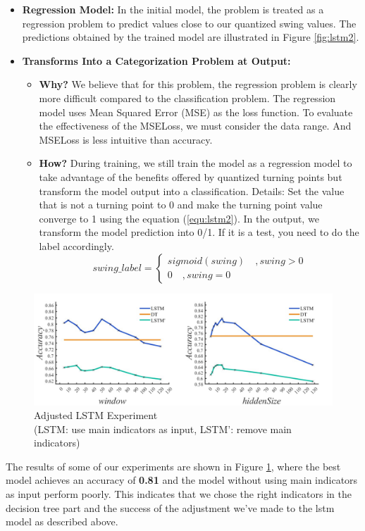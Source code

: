 \begin{itemize}
    \item \textbf{Regression Model: }
    In the initial model, the problem is treated as a regression problem to predict values close to our quantized swing values. The predictions obtained by the trained model are illustrated in Figure \ref{fig:lstm2}.
    \item \textbf{Transforms Into a Categorization Problem at Output:}
    \begin{itemize}
        \item \textbf{Why?}
        We believe that for this problem, the regression problem is clearly more difficult compared to the classification problem.
        The regression model uses Mean Squared Error (MSE) as the loss function. To evaluate the effectiveness of the MSELoss, we must consider the data range. And MSELoss is less intuitive than accuracy.
        \item \textbf{How?}
        During training, we still train the model as a regression model to take advantage of the benefits offered by quantized turning points but transform the model output into a classification. Details: Set the value that is not a turning point to 0 and make the turning point value converge to 1 using the equation (\ref{equ:lstm2}). In the output, we transform the model prediction into 0/1. If it is a test, you need to do the label accordingly.
        \begin{equation}
            swing\_label =\begin{cases} sigmoid(swing)\quad ,swing>0 \\0\quad,swing=0 \end{cases}  
            \label{equ:lstm2}
        \end{equation}
    \end{itemize}
    
\end{itemize}
\begin{figure}[bt!]
    \centering
    \includegraphics[width=1\linewidth]{figure/lstm3.png}
    \caption{\centering Adjusted LSTM Experiment\\
    \vspace{2pt}
    (LSTM: use main indicators as input, LSTM': remove main indicators)}
    \label{fig:lstm3}
\end{figure}
The results of some of our experiments are shown in Figure \ref{fig:lstm3}, where the best model achieves an accuracy of \textbf{0.81} and the model without using main indicators as input perform poorly. This indicates that we chose the right indicators in the decision tree part and the success of the adjustment we've made to the lstm model as described above.

